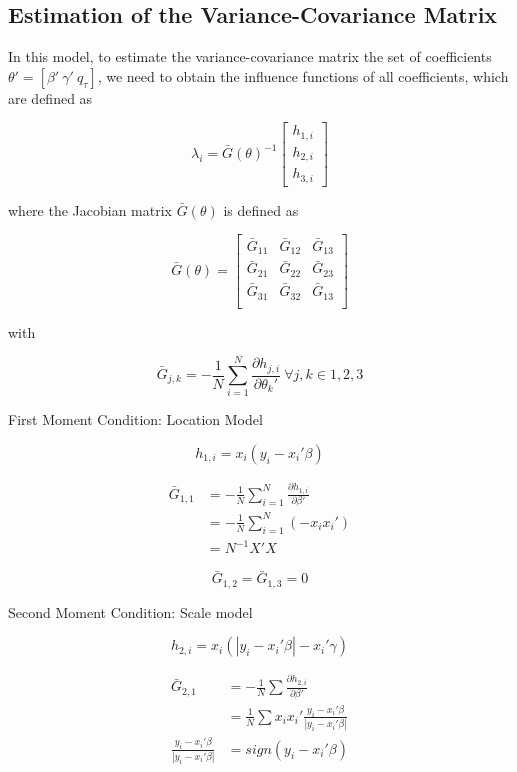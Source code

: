 \documentclass[
  authoryear,
  review,
  1p]{elsarticle}
\begin{document}
\subsection{Estimation of the Variance-Covariance
Matrix}\label{estimation-of-the-variance-covariance-matrix}

In this model, to estimate the variance-covariance matrix the set of
coefficients \(\theta'=[\beta' \ \gamma' \ q_\tau]\), we need to obtain
the influence functions of all coefficients, which are defined as

\[\lambda_i = \bar G(\theta)^{-1}
\begin{bmatrix}
h_{1,i} \\
h_{2,i} \\
h_{3,i}
\end{bmatrix}
\]

where the Jacobian matrix \(\bar G(\theta)\) is defined as

\[\bar G(\theta) = \begin{bmatrix}
\bar G_{11} & \bar G_{12} & \bar G_{13} \\
\bar G_{21} & \bar G_{22} & \bar G_{23} \\
\bar G_{31} & \bar G_{32} & \bar G_{13} \\
\end{bmatrix}
\]

with

\[\bar G_{j,k} = - \frac 1 N \sum_{i=1}^N \frac{\partial h_{j,i}}{\partial \theta_k'} \ \forall j,k \in 1,2,3
\]

First Moment Condition: Location Model

\[h_{1,i}=x_i(y_i-x_i'\beta)\]

\[\begin{aligned}
\bar G_{1,1} &=- \frac{1}{N} \sum_{i=1}^N \frac{\partial h_{1,i}}{\partial \beta'} \\
             &=- \frac{1}{N} \sum_{i=1}^N (-x_i x_i') \\
             &= N^{-1} X'X
\end{aligned}
\]

\[
\bar G_{1,2} = \bar G_{1,3} = 0
\]

Second Moment Condition: Scale model

\[h_{2,i}=x_i(|y_i-x_i'\beta|-x_i'\gamma)\]

\[\begin{aligned}
\bar G_{2,1} &= -\frac{1}{N} \sum \frac{\partial h_{2,i}}{\partial \beta'} \\
             &=  \frac{1}{N} \sum x_i x_i' \frac{y_i-x_i'\beta}{|y_i-x_i'\beta|} \\
\frac{y_i-x_i'\beta}{|y_i-x_i'\beta|} &= sign(y_i-x_i'\beta) \\            
\end{aligned}
\]
\end{document}
